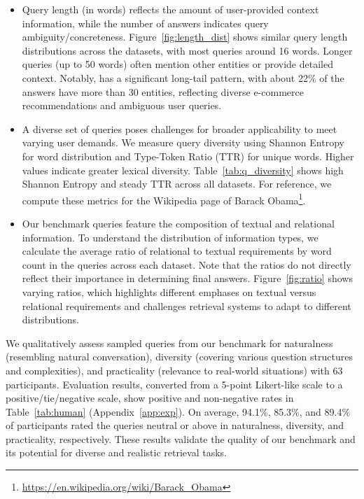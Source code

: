 \begin{itemize}[leftmargin=*]
    \item {} 
    Query length (in words) reflects the amount of user-provided context information, while the number of answers indicates query ambiguity/concreteness.
    Figure~\ref{fig:length_dist} shows similar query length distributions across the datasets, with most queries around 16 words. Longer queries (up to 50 words) often mention other entities or provide detailed context. Notably, 
    \amazonh has a significant long-tail pattern, with about 22\% of the answers have more than 30 entities, reflecting diverse e-commerce recommendations and ambiguous user queries.
     
    \item {} %
    A diverse set of queries poses challenges for broader applicability to meet varying user demands. We measure query diversity using Shannon Entropy for word distribution and Type-Token Ratio (TTR) for unique words. Higher values indicate greater lexical diversity. Table~\ref{tab:q_diversity} shows high Shannon Entropy and steady TTR across all datasets. For reference, we compute these metrics for the Wikipedia page of Barack Obama\footnote{\url{https://en.wikipedia.org/wiki/Barack\_Obama}}. 
    
    \item {}
    Our benchmark queries feature the composition of textual and relational information. To understand the distribution of information types, we calculate the average ratio of relational to textual requirements by word count in the queries across each dataset.  
    Note that the ratios do not directly reflect their importance in determining final answers. Figure~\ref{fig:ratio} shows varying ratios, which highlights different emphases on textual versus relational requirements and challenges retrieval systems to adapt to different distributions.

\end{itemize}

We qualitatively assess sampled queries from our benchmark for naturalness (resembling natural conversation), diversity (covering various question structures and complexities), and practicality (relevance to real-world situations) with 63 participants. Evaluation results, converted from a 5-point Likert-like scale to a positive/tie/negative scale, show positive and non-negative rates in Table~\ref{tab:human} (Appendix~\ref{app:exp}). On average, 94.1\%, 85.3\%, and 89.4\% of participants rated the queries neutral or above in naturalness, diversity, and practicality, respectively. These results validate the quality of our benchmark and its potential for diverse and realistic retrieval tasks.
